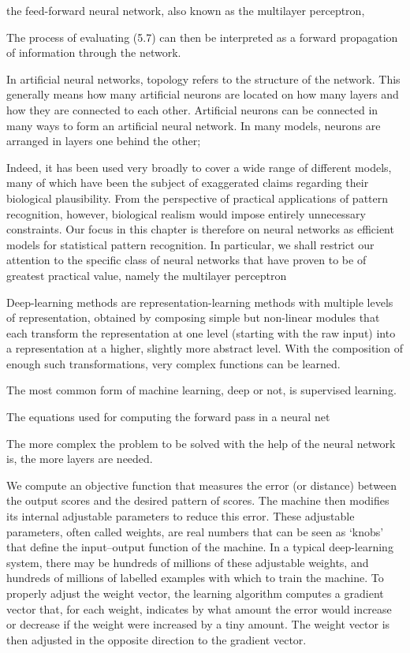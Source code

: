 the feed-forward neural network, also known as the multilayer perceptron,

The process of evaluating (5.7) can then be interpreted as a forward
propagation of information through the network.

In artificial neural networks, topology refers to the structure of the network. This generally means how many artificial neurons are located on how many layers and how they are connected to each other. Artificial neurons can be connected in many ways to form an artificial neural network. In many models, neurons are arranged in layers one behind the other; 




Indeed,
it has been used very broadly to cover a wide range of different models, many of
which have been the subject of exaggerated claims regarding their biological plausibility. From the perspective of practical applications of pattern recognition, however, biological realism would impose entirely unnecessary constraints. Our focus in
this chapter is therefore on neural networks as efficient models for statistical pattern
recognition. In particular, we shall restrict our attention to the specific class of neural networks that have proven to be of greatest practical value, namely the multilayer
perceptron

Deep-learning methods are representation-learning methods with multiple levels of representation, obtained by composing simple but non-linear modules that each transform the representation at one level (starting with the raw input) into a representation at a higher, slightly more abstract level. With the composition of enough such transformations, very complex functions can be learned.

The most common form of machine learning, deep or not, is supervised learning.

The equations used for computing the forward pass in a neural net



The more complex the problem to be solved with the help of the neural network is, the more layers are needed. 

We compute an objective function that measures the error (or distance) between the output scores and the desired pattern of scores. The machine then modifies its internal adjustable parameters to reduce  this error. These adjustable parameters, often called weights, are real numbers that can be seen as ‘knobs’ that define the input–output function of the machine. In a typical deep-learning system, there may be hundreds of millions of these adjustable weights, and hundreds of millions of labelled examples with which to train the machine. To properly adjust the weight vector, the learning algorithm computes a gradient vector that, for each weight, indicates by what amount the error would increase or decrease if the weight were increased by a tiny amount. The weight vector is then adjusted in the opposite direction to the gradient vector. 

